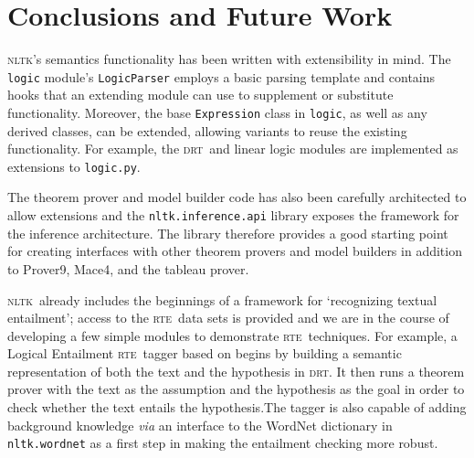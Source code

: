 \documentclass[11pt, a4paper]{article}
\newcommand{\DRT}{\textsc{drt}}
\newcommand{\NLTK}{\textsc{nltk}}
\newcommand{\RTE}{\textsc{rte}}
\begin{document}
\section{Conclusions and Future Work}

\NLTK's semantics functionality has been written with extensibility in
mind.  The \texttt{logic} module's \texttt{LogicParser}
employs a basic parsing template and contains hooks that an extending
module can use to supplement or substitute functionality.  Moreover, the
base \texttt{Expression} class in \texttt{logic}, as well as any
derived classes, can be extended, allowing variants to reuse the
existing functionality.  For example, the \DRT\ and linear logic modules
are implemented as extensions to \texttt{logic.py}.

The theorem prover and model builder code has also been carefully
archi\-tected to allow extensions and the \texttt{nltk.inference.api}
library exposes the framework for the inference architecture.  The
library therefore provides a good starting point for creating
interfaces with other theorem provers and model builders in addition to Prover9, Mace4, and the tableau prover.  %

\NLTK\ already includes the beginnings of a framework for `recognizing
textual entailment'; access to the \RTE\ data sets is provided and we
are in the course of developing a few simple modules to demonstrate
\RTE\ techniques.  For example, a Logical Entailment \RTE\ tagger
based on \cite{BosRTE} begins by building a semantic
representation of both the text and the hypothesis in \DRT.  It then
runs a theorem prover with the text as the assumption and the
hypothesis as the goal in order to check whether the text entails the
hypothesis.The tagger is also capable of adding background knowledge
\textit{via} an interface to the WordNet dictionary in
\texttt{nltk.wordnet} as a first step in making the entailment
checking more robust.




{\small

}
\end{document}
